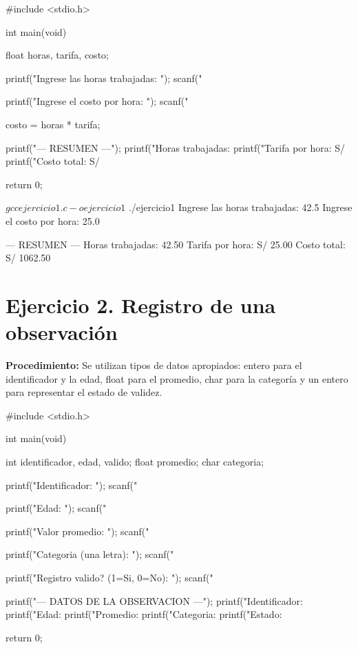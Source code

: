 \documentclass[11pt, a4paper]{article}
\begin{document}
\begin{codebox}[title={CÓDIGO FUENTE EN C: Ejercicio 1}]
#include <stdio.h>

int main(void) {
    float horas, tarifa, costo;

    printf("Ingrese las horas trabajadas: ");
    scanf("%

    printf("Ingrese el costo por hora: ");
    scanf("%

    costo = horas * tarifa;

    printf("\n--- RESUMEN ---\n");
    printf("Horas trabajadas: %
    printf("Tarifa por hora: S/ %
    printf("Costo total: S/ %

    return 0;
}
\end{codebox}

\begin{terminalout}
$ gcc ejercicio1.c -o ejercicio1
$ ./ejercicio1
Ingrese las horas trabajadas: 42.5
Ingrese el costo por hora: 25.0

--- RESUMEN ---
Horas trabajadas: 42.50
Tarifa por hora: S/ 25.00
Costo total: S/ 1062.50
\end{terminalout}

\newpage

\section*{Ejercicio 2. Registro de una observación}
\textbf{Procedimiento:} Se utilizan tipos de datos apropiados: entero para el identificador y la edad, float para el promedio, char para la categoría y un entero para representar el estado de validez.

\begin{codebox}[title={CÓDIGO FUENTE EN C: Ejercicio 2}]
#include <stdio.h>

int main(void) {
    int identificador, edad, valido;
    float promedio;
    char categoria;

    printf("Identificador: ");
    scanf("%

    printf("Edad: ");
    scanf("%

    printf("Valor promedio: ");
    scanf("%

    printf("Categoria (una letra): ");
    scanf(" %

    printf("Registro valido? (1=Si, 0=No): ");
    scanf("%

    printf("\n--- DATOS DE LA OBSERVACION ---\n");
    printf("Identificador: %
    printf("Edad: %
    printf("Promedio: %
    printf("Categoria: %
    printf("Estado: %

    return 0;
}
\end{codebox}
\end{document}
